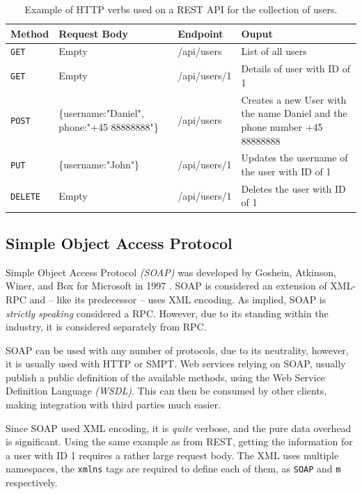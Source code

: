 			\begin{table}
				\begin{tabular}{p{} | p{} | p{} | p{}}
					Method & Request Body & Endpoint & Ouput \\
					\hline
					\verb=GET= & Empty & /api/users & List of all users \\
					\hline
					\verb=GET= & Empty & /api/users/1 & Details of user with ID of 1 \\
					\hline
					\verb=POST= & \{username:"Daniel", phone:"+45 88888888"\} & /api/users & Creates a new User with the name Daniel and the phone number +45 88888888 \\
					\hline
					\verb=PUT= & \{username:"John"\} & /api/users/1 & Updates the username of the user with ID of 1\\
					\hline
					\verb=DELETE= & Empty & /api/users/1 & Deletes the user with ID of 1\\
				\end{tabular}

				\caption{Example of HTTP verbs used on a REST API for the collection of users.}
				\label{tbl:rest_example}

			\end{table}

		\subsection{Simple Object Access Protocol}
			Simple Object Access Protocol \emph{(SOAP)} was developed by Goshein, Atkinson, Winer, and Box for Microsoft in 1997 \cite{soap_origin}. SOAP is considered an extension of XML-RPC and -- like its predecessor -- uses XML encoding. As implied, SOAP is \emph{strictly speaking} considered a RPC. However, due to its standing within the industry, it is considered separately from RPC. 

			SOAP can be used with any number of protocols, due to its neutrality, however, it is usually used with HTTP or SMPT. Web services relying on SOAP, usually publish a public definition of the available methods, using the Web Service Definition Language \emph{(WSDL)}. This can then be consumed by other clients, making integration with third parties much easier.

			Since SOAP used XML encoding, it is \emph{quite} verbose, and the pure data overhead is significant. Using the same example as from REST, getting the information for a user with ID 1 requires a rather large request body. The XML uses multiple namespaces, the \verb=xmlns= tags are required to define each of them, as \verb=SOAP= and \verb=m= respectively.

